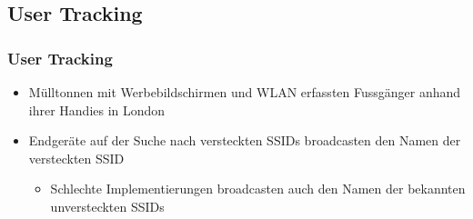 \documentclass{beamer}
\begin{document}
\subsection{User Tracking}
\begin{frame}
\frametitle{User Tracking}
\begin{itemize}
	\item Mülltonnen mit Werbebildschirmen und WLAN erfassten Fussgänger anhand ihrer Handies in London \cite{mulltonnen}
	\vspace{1,5cm}
	\item Endgeräte auf der Suche nach versteckten SSIDs broadcasten den Namen der versteckten SSID
	\begin{itemize}
		\item Schlechte Implementierungen broadcasten auch den Namen der bekannten unversteckten SSIDs
	\end{itemize}
\end{itemize}
\end{frame}
\end{document}
